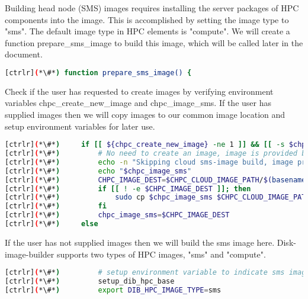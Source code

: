 	Building head node (SMS) images requires installing the server packages of HPC components into the image. This is accomplished by setting the image type to "sms". The default image type in HPC elements is "compute". We will create a function prepare\_sms\_image to build this image, which will be called later in the document.

\begin{lstlisting}[language=bash,keywords={}]
[ctrlr](*\#*) function prepare_sms_image() {
\end{lstlisting} 

	Check if the user has requested to create images by verifying environment variables chpc\_create\_new\_image and chpc\_image\_sms. If the user has supplied images then we will copy images to our common image location and setup environment variables for later use.
	
\begin{lstlisting}[language=bash,keywords={}]
[ctrlr](*\#*)     if [[ ${chpc_create_new_image} -ne 1 ]] && [[ -s $chpc_image_sms ]]; then
[ctrlr](*\#*)         # No need to create an image, image is provided by the user
[ctrlr](*\#*)         echo -n "Skipping cloud sms-image build, image provided:"
[ctrlr](*\#*)         echo "$chpc_image_sms"
[ctrlr](*\#*)         CHPC_IMAGE_DEST=$CHPC_CLOUD_IMAGE_PATH/$(basename $chpc_image_sms)
[ctrlr](*\#*)         if [[ ! -e $CHPC_IMAGE_DEST ]]; then
[ctrlr](*\#*)             sudo cp $chpc_image_sms $CHPC_CLOUD_IMAGE_PATH
[ctrlr](*\#*)         fi
[ctrlr](*\#*)         chpc_image_sms=$CHPC_IMAGE_DEST
[ctrlr](*\#*)     else
\end{lstlisting} 

	If the user has not supplied images then we will build the sms image here. Disk-image-builder supports two types of HPC images, "sms" and "compute".  

\begin{lstlisting}[language=bash,keywords={}]
[ctrlr](*\#*)         # setup environment variable to indicate sms image type
[ctrlr](*\#*)         setup_dib_hpc_base
[ctrlr](*\#*)         export DIB_HPC_IMAGE_TYPE=sms
\end{lstlisting} 
